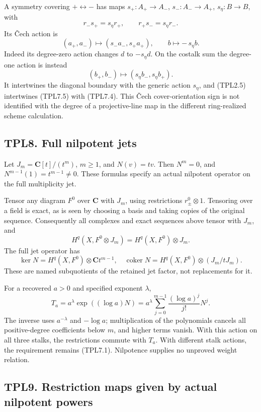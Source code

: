 A symmetry covering \(+\leftrightarrow-\) has maps \(s_+:A_+\to A_-\),
\(s_-:A_-\to A_+\), \(s_\eta:B\to B\), with \[
r_-s_+=s_\eta r_+,\qquad r_+s_-=s_\eta r_-.
\tag{TPL7.3}
\] Its Čech action is \[
(a_+,a_-)\mapsto(s_-a_-,s_+a_+),\qquad b\mapsto-\,s_\eta b.
\tag{TPL7.4}
\] Indeed its degree-zero action changes \(d\) to \(-s_\eta d\). On the
costalk sum the degree-one action is instead \[
(b_+,b_-)\mapsto(s_\eta b_-,s_\eta b_+).
\tag{TPL7.5}
\] It intertwines the diagonal boundary with the generic action
\(s_\eta\), and (TPL2.5) intertwines (TPL7.5) with (TPL7.4). This Čech
cover-orientation sign is not identified with the degree of a
projective-line map in the different ring-realized scheme calculation.

\subsection{TPL8. Full nilpotent jets}\label{tpl8.-full-nilpotent-jets}

Let \(J_m=\mathbf C[t]/(t^m)\), \(m\ge1\), and \(N(v)=tv\). Then
\(N^m=0\), and \(N^{m-1}(1)=t^{m-1}\ne0\). These formulas specify an
actual nilpotent operator on the full multiplicity jet.

Tensor any diagram \(F^0\) over \(\mathbf C\) with \(J_m\), using
restrictions \(r_\pm^0\otimes1\). Tensoring over a field is exact, as is
seen by choosing a basis and taking copies of the original sequence.
Consequently all complexes and exact sequences above tensor with
\(J_m\), and \[
H^q(X,F^0\otimes J_m)=H^q(X,F^0)\otimes J_m.
\tag{TPL8.1}
\] The full jet operator has \[
\ker N=H^q(X,F^0)\otimes\mathbf C t^{m-1},
\quad
\operatorname{coker}N=H^q(X,F^0)\otimes(J_m/tJ_m).
\tag{TPL8.2}
\] These are named subquotients of the retained jet factor, not
replacements for it.

For a recovered \(a>0\) and specified exponent \(\lambda\), \[
T_a=a^\lambda\exp((\log a)N)
=a^\lambda\sum_{j=0}^{m-1}\frac{(\log a)^j}{j!}N^j.
\tag{TPL8.3}
\] The inverse uses \(a^{-\lambda}\) and \(-\log a\); multiplication of
the polynomials cancels all positive-degree coefficients below \(m\),
and higher terms vanish. With this action on all three stalks, the
restrictions commute with \(T_a\). With different stalk actions, the
requirement remains (TPL7.1). Nilpotence supplies no unproved weight
relation.

\subsection{TPL9. Restriction maps given by actual nilpotent
powers}\label{tpl9.-restriction-maps-given-by-actual-nilpotent-powers}

